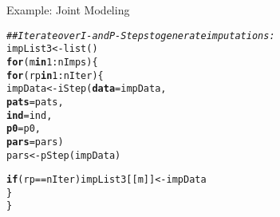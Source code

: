 \documentclass[10pt]{beamer}\usepackage[]{graphicx}\usepackage[]{color}
\makeatletter
\newcommand{\hlnum}[1]{\textcolor[rgb]{0.69,0.494,0}{#1}}%
\newcommand{\hlcom}[1]{\textcolor[rgb]{0.514,0.506,0.514}{\textit{#1}}}%
\newcommand{\hlopt}[1]{\textcolor[rgb]{0,0,0}{#1}}%
\newcommand{\hlstd}[1]{\textcolor[rgb]{0,0,0}{#1}}%
\newcommand{\hlkwa}[1]{\textcolor[rgb]{0,0,0}{\textbf{#1}}}%
\newcommand{\hlkwb}[1]{\textcolor[rgb]{0,0.341,0.682}{#1}}%
\newcommand{\hlkwc}[1]{\textcolor[rgb]{0,0,0}{\textbf{#1}}}%
\newcommand{\hlkwd}[1]{\textcolor[rgb]{0.004,0.004,0.506}{#1}}%
\newenvironment{kframe}{%
 \def\at@end@of@kframe{}%
 \ifinner\ifhmode%
  \def\at@end@of@kframe{\end{minipage}}%
  \begin{minipage}{\columnwidth}%
 \fi\fi%
 \def\FrameCommand##1{\hskip\@totalleftmargin \hskip-\fboxsep
 \colorbox{shadecolor}{##1}\hskip-\fboxsep
     \hskip-\linewidth \hskip-\@totalleftmargin \hskip\columnwidth}%
 \MakeFramed {\advance\hsize-\width
   \@totalleftmargin\z@ \linewidth\hsize
   \@setminipage}}%
 {\par\unskip\endMakeFramed%
 \at@end@of@kframe}
\newenvironment{knitrout}{}{} %
\makeatother
\begin{document}
\begin{frame}[fragile]{Example: Joint Modeling}

\begin{knitrout}\footnotesize
{}\color{fgcolor}\begin{kframe}
\begin{alltt}
\hlcom{## Iterate over I- and P-Steps to generate imputations:}
\hlstd{impList3} \hlkwb{<-} \hlkwd{list}\hlstd{()}
\hlkwa{for}\hlstd{(m} \hlkwa{in} \hlnum{1} \hlopt{:} \hlstd{nImps) \{}
    \hlkwa{for}\hlstd{(rp} \hlkwa{in} \hlnum{1} \hlopt{:} \hlstd{nIter) \{}
        \hlstd{impData} \hlkwb{<-} \hlkwd{iStep}\hlstd{(}\hlkwc{data} \hlstd{= impData,}
                         \hlkwc{pats} \hlstd{= pats,}
                         \hlkwc{ind}  \hlstd{= ind,}
                         \hlkwc{p0}   \hlstd{= p0,}
                         \hlkwc{pars} \hlstd{= pars)}
        \hlstd{pars} \hlkwb{<-} \hlkwd{pStep}\hlstd{(impData)}

        \hlkwa{if}\hlstd{(rp} \hlopt{==} \hlstd{nIter) impList3[[m]]} \hlkwb{<-} \hlstd{impData}
    \hlstd{\}}
\hlstd{\}}
\end{alltt}


{\ttfamily\noindent\bfseries\color{errorcolor}{Error in iStep(data = impData, pats = pats, ind = ind, p0 = p0, pars = pars): object 'pats' not found}}\end{kframe}
\end{knitrout}

\end{frame}

\end{document}
